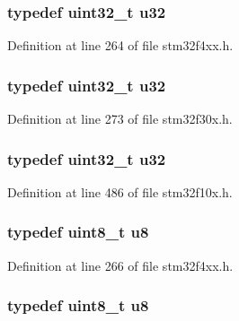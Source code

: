 \hypertarget{group___exported__types_gafaa62991928fb9fb18ff0db62a040aba}{
\subsubsection[{u32}]{\setlength{\rightskip}{0pt plus 5cm}typedef {\bf uint32\-\_\-t} {\bf u32}}}\label{group___exported__types_gafaa62991928fb9fb18ff0db62a040aba}


Definition at line 264 of file stm32f4xx.\-h.

\hypertarget{group___exported__types_gafaa62991928fb9fb18ff0db62a040aba}{
\subsubsection[{u32}]{\setlength{\rightskip}{0pt plus 5cm}typedef {\bf uint32\-\_\-t} {\bf u32}}}\label{group___exported__types_gafaa62991928fb9fb18ff0db62a040aba}


Definition at line 273 of file stm32f30x.\-h.

\hypertarget{group___exported__types_gafaa62991928fb9fb18ff0db62a040aba}{
\subsubsection[{u32}]{\setlength{\rightskip}{0pt plus 5cm}typedef {\bf uint32\-\_\-t} {\bf u32}}}\label{group___exported__types_gafaa62991928fb9fb18ff0db62a040aba}


Definition at line 486 of file stm32f10x.\-h.

\hypertarget{group___exported__types_ga92c50087ca0e64fa93fc59402c55f8ca}{
\subsubsection[{u8}]{\setlength{\rightskip}{0pt plus 5cm}typedef {\bf uint8\-\_\-t} {\bf u8}}}\label{group___exported__types_ga92c50087ca0e64fa93fc59402c55f8ca}


Definition at line 266 of file stm32f4xx.\-h.

\hypertarget{group___exported__types_ga92c50087ca0e64fa93fc59402c55f8ca}{
\subsubsection[{u8}]{\setlength{\rightskip}{0pt plus 5cm}typedef {\bf uint8\-\_\-t} {\bf u8}}}\label{group___exported__types_ga92c50087ca0e64fa93fc59402c55f8ca}


